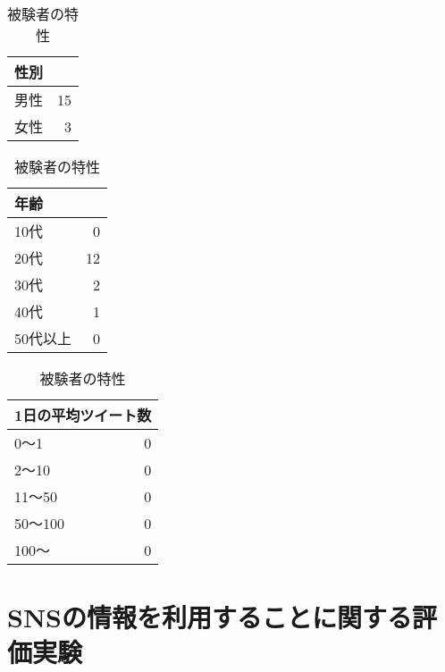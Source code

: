 \begin{table}[ht]
  \begin{minipage}{0.3\hsize}
    \begin{center}
      \small
      \begin{tabular}{|l|r|} \hline
        \multicolumn{2}{|l|}{性別} \\ \hline
        男性 & 15 \\
        女性 & 3 \\ \hline
      \end{tabular}
    \end{center}
  \end{minipage}
  \begin{minipage}{0.3\hsize}
    \begin{center}
      \small
      \begin{tabular}{|l|r|} \hline
        \multicolumn{2}{|l|}{年齢} \\ \hline
        10代 & 0 \\
        20代 & 12 \\
        30代 & 2 \\
        40代 & 1 \\
        50代以上 & 0 \\ \hline
      \end{tabular}
    \end{center}
  \end{minipage}
  \begin{minipage}{0.3\hsize}
    \begin{center}
      \small
      \begin{tabular}{|l|r|} \hline
        \multicolumn{2}{|l|}{1日の平均ツイート数} \\ \hline
        0〜1 & 0 \\
        2〜10 & 0 \\
        11〜50 & 0 \\
        50〜100 & 0 \\
        100〜 & 0 \\ \hline
      \end{tabular}
    \end{center}
  \end{minipage}
  \caption{被験者の特性}
  \label{tab:participants}
\end{table}

\section{SNSの情報を利用することに関する評価実験}\label{sec:vsTweet}
